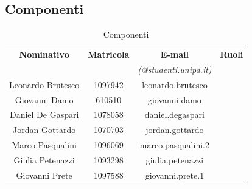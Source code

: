 \subsection{Componenti}
\begin{table}[H]
		\begin{center}
		\begin{tabular}{cccc}
			\toprule
			\textbf{Nominativo} & \textbf{Matricola} & \textbf{E-mail} & \textbf{Ruoli} \\
			 &  & \textit{(@studenti.unipd.it)} & \\
			\midrule
	 		\multirow{2}{*}{Leonardo Brutesco} & \multirow{2}{*}{1097942}	& \multirow{2}{*}{leonardo.brutesco}	& \responsabile{} \\ & & & \progettista{} \\
			\midrule
			\multirow{2}{*}{Giovanni Damo}	& \multirow{2}{*}{610510}	& \multirow{2}{*}{giovanni.damo} & \responsabile{}\\ & & &  \progettista{}\\
			\midrule
			\multirow{2}{*}{Daniel De Gaspari} 	& \multirow{2}{*}{1078058}	& \multirow{2}{*}{daniel.degaspari} & \verificatore{}\\ & & &  \progettista{}\\
			\midrule
			\multirow{2}{*}{Jordan Gottardo}	& \multirow{2}{*}{1070703}	& \multirow{2}{*}{jordan.gottardo} & \verificatore{}\\ & & &  \progettista{} \\
			\midrule
			\multirow{3}{*}{Marco Pasqualini}	& \multirow{3}{*}{1096069}	&  \multirow{3}{*}{marco.pasqualini.2} & \analista{}\\ & & &  \progettista{}\\ & & &  \amministratore{}\\
			\midrule
			\multirow{3}{*}{Giulia	Petenazzi}	& \multirow{3}{*}{1093298}	& \multirow{3}{*}{giulia.petenazzi} & \analista{}\\ & & &  \progettista{} \\
			& & &  \amministratore{}\\
			\midrule
			\multirow{2}{*}{Giovanni Prete}	& \multirow{2}{*}{1097588}	& \multirow{2}{*}{giovanni.prete.1} & \verificatore{}\\ & & &  \progettista{}\\
			\midrule
		\end{tabular}
	\end{center}
	\caption{Componenti}
\end{table}
